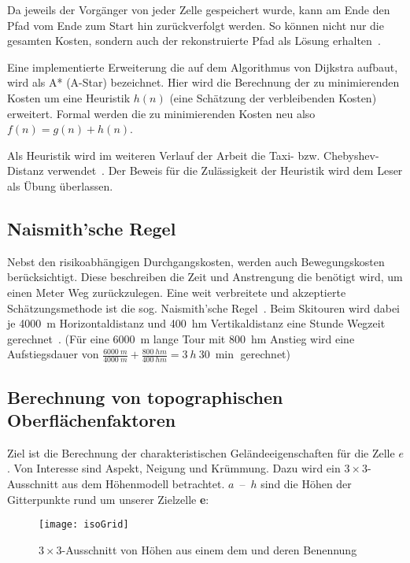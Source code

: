 Da jeweils der Vorgänger von jeder Zelle gespeichert wurde, kann am Ende den Pfad vom Ende zum Start hin zurückverfolgt werden. So können nicht nur die gesamten Kosten, sondern auch der rekonstruierte Pfad als Lösung erhalten~\cite{dijkstra1959note}.

Eine implementierte Erweiterung die auf dem Algorithmus von Dijkstra aufbaut, wird als A* (A-Star) bezeichnet. Hier wird die Berechnung der zu minimierenden Kosten um eine Heuristik $h(n)$ (eine Schätzung der verbleibenden Kosten) erweitert. Formal werden die zu minimierenden Kosten neu also $f(n)=g(n)+h(n)$.~\cite{Hart1968}

Als Heuristik wird im weiteren Verlauf der Arbeit die Taxi- bzw. Chebyshev-Distanz verwendet~\cite{cantrell2000modern}. Der Beweis für die Zulässigkeit der Heuristik wird dem Leser als Übung überlassen. 

\subsection{Naismith'sche Regel}

Nebst den risikoabhängigen Durchgangskosten, werden auch Bewegungskosten berücksichtigt. Diese beschreiben die Zeit und Anstrengung die benötigt wird, um einen Meter Weg zurückzulegen. Eine weit verbreitete und akzeptierte Schätzungsmethode ist die sog. Naismith'sche Regel~\cite{naismithsrule}.
Beim Skitouren wird dabei je \qty{4000}{m} Horizontaldistanz und \qty{400}{hm} Vertikaldistanz eine Stunde Wegzeit gerechnet~\cite{sacbergspwinter}\cite{naismithsrule}. (Für eine \qty{6000}{m} lange Tour mit \qty{800}{hm} Anstieg wird eine Aufstiegsdauer von $\frac{\qty{6000}{m}}{\qty{4000}{m}} + \frac{\qty{800}{hm}}{\qty{400}{hm}} = \qty{3}{h}\ \qty{30}{\min}$ gerechnet)

\clearpage
\subsection{Berechnung von topographischen Oberflächenfaktoren}
Ziel ist die Berechnung der charakteristischen Geländeeigenschaften für die Zelle $e$.
Von Interesse sind Aspekt, Neigung und Krümmung.
Dazu wird ein $3 \times 3$-Ausschnitt aus dem Höhenmodell betrachtet. 
$a$~--~$h$ sind die Höhen der Gitterpunkte rund um unserer Zielzelle \textbf{e}:

\begin{figure}[H]
  \centering
  \texttt{[image: isoGrid]}
  \caption{$3 \times 3$-Ausschnitt von Höhen aus einem \acrshort{dem} und deren Benennung}
\end{figure}

